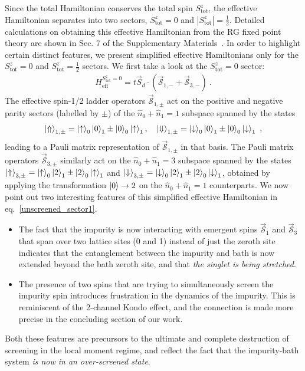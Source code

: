 \documentclass{iopart}
\begin{document}
Since the total Hamiltonian conserves the total spin \(S_\text{tot}^z\), the effective Hamiltonian separates into two sectors, \(S_\text{tot}^z = 0\) and \(|S_\text{tot}^z| = \frac{1}{2}\). Detailed calculations on obtaining this effective Hamiltonian from the RG fixed point theory are shown in Sec. 7 of the Supplementary Materials~\cite{supp_mat}. In order to highlight certain distinct features, we present simplified effective Hamiltonians only for the \(S_\text{tot}^z = 0\) and \(S_\text{tot}^z = \frac{1}{2}\) sectors. We first take a look at the \(S^z_\text{tot}=0\) sector:
\begin{eqnarray}
	H_\text{eff}^{S^z_\text{tot}=0} = t\vec{S}_d\cdot\left(\vec{\mathcal{S}}_{1,-} + \vec{\mathcal{S}}_{3,-}\right)
	\label{unscreened_sector1}~.
\end{eqnarray}
The effective spin-1/2 ladder operators \(\vec{\mathcal{S}}_{1,\pm}\) act on the positive and negative parity sectors (labelled by $\pm$) of the \(\hat n_0 + \hat n_1 = 1\) subspace spanned by the states
\begin{eqnarray}
	\ket{\Uparrow}_{1,\pm} = \ket{\uparrow}_0\ket{0}_1 \pm \ket{0}_0\ket{\uparrow}_1, \quad \ket{\Downarrow}_{1,\pm} = \ket{\downarrow}_0\ket{0}_1 \pm \ket{0}_0\ket{\downarrow}_1~,
\end{eqnarray}
leading to a Pauli matrix representation of $\vec{\mathcal{S}}_{1,\pm}$ in that basis.
The Pauli matrix operators \(\vec{\mathcal{S}}_{3,\pm}\) similarly act on the \(\hat n_0 + \hat n_1 = 3\) subspace spanned by the states \(\ket{\Uparrow}_{3,\pm} = \ket{\uparrow}_0\ket{2}_1 \pm \ket{2}_0\ket{\uparrow}_1\) and \(\ket{\Downarrow}_{3,\pm} = \ket{\downarrow}_0\ket{2}_1 \pm \ket{2}_0\ket{\downarrow}_1\), obtained by applying the transformation \(\ket{0} \to {2}\) on the \(\hat n_0 + \hat n_1 = 1\) counterparts. 
We now point out two interesting features of this simplified effective Hamiltonian in eq.~\eqref{unscreened_sector1}.
\begin{itemize}
	\item The fact that the impurity is now interacting with emergent spins \(\vec{\mathcal{S}}_1\) and \(\vec{\mathcal{S}}_3\) that span over two lattice sites (0 and 1) instead of just the zeroth site indicates that the entanglement between the impurity and bath is now extended beyond the bath zeroth site, and that {\it the singlet is being stretched}. 
	\item The presence of two spins that are trying to simultaneously screen the impurity spin introduces frustration in the dynamics of the impurity. This is reminiscent of the 2-channel Kondo effect, and the connection is made more precise in the concluding section of our work. 
\end{itemize}
Both these features are precursors to the ultimate and complete destruction of screening in the local moment regime, and reflect the fact that the impurity-bath system {\it is now in an over-screened state}.
\end{document}
